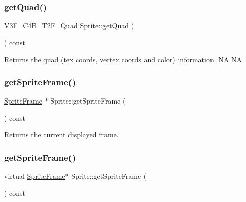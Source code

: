 \subsubsection{\texorpdfstring{get\+Quad()}{getQuad()}\hspace{0.1cm}{\footnotesize\ttfamily [2/2]}}
{\footnotesize\ttfamily \hyperlink{structV3F__C4B__T2F__Quad}{V3\+F\+\_\+\+C4\+B\+\_\+\+T2\+F\+\_\+\+Quad} Sprite\+::get\+Quad (\begin{DoxyParamCaption}{ }\end{DoxyParamCaption}) const\hspace{0.3cm}{\ttfamily [inline]}}

Returns the quad (tex coords, vertex coords and color) information.  NA  NA \mbox{\label{classSprite_abdda1faf423bfcb61dd253399247626c}} 
\subsubsection{\texorpdfstring{get\+Sprite\+Frame()}{getSpriteFrame()}\hspace{0.1cm}{\footnotesize\ttfamily [1/2]}}
{\footnotesize\ttfamily \hyperlink{classSpriteFrame}{Sprite\+Frame} $\ast$ Sprite\+::get\+Sprite\+Frame (\begin{DoxyParamCaption}{ }\end{DoxyParamCaption}) const\hspace{0.3cm}{\ttfamily [virtual]}}

Returns the current displayed frame. \mbox{\label{classSprite_a6921c3ed0ee8e8349e3581d8fbf496c2}} 
\subsubsection{\texorpdfstring{get\+Sprite\+Frame()}{getSpriteFrame()}\hspace{0.1cm}{\footnotesize\ttfamily [2/2]}}
{\footnotesize\ttfamily virtual \hyperlink{classSpriteFrame}{Sprite\+Frame}$\ast$ Sprite\+::get\+Sprite\+Frame (\begin{DoxyParamCaption}{ }\end{DoxyParamCaption}) const\hspace{0.3cm}{\ttfamily [virtual]}}

